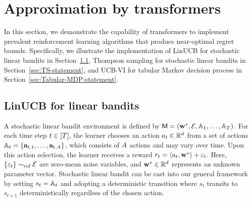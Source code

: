 \section{Approximation by transformers}\label{sec:ICRL}

In this section, we demonstrate the capability of transformers to implement prevalent reinforcement learning algorithms that produce near-optimal regret bounds. Specifically, we illustrate the implementation of LinUCB for stochastic linear bandits in Section~\ref{sec:LinUCB-statement}, Thompson sampling for stochastic linear bandits in Section~\ref{sec:TS-statement}, and UCB-VI for tabular Markov decision process in Section~\ref{sec:Tabular-MDP-statement}. %

\subsection{LinUCB for linear bandits}\label{sec:LinUCB-statement}

A stochastic linear bandit environment is defined by ${\mathsf{M}}=({{\mathbf w}^*},{\mathcal{E}},{{\mathbb{A}}}_1,\ldots,{{\mathbb{A}}}_{T})$. For each time step $t\in[{T}]$, the learner chooses an action ${a}_t\in\mathbb{R}^{d}$ from a set of actions ${\mathbb{A}}_t=\{{\mathbf a}_{t,1},\ldots,{\mathbf a}_{t,{A}}\}$, which consists of ${A}$ actions and may vary over time. Upon this action selection, the learner receives a reward ${r}_t=\left\langle{a}_t,{{\mathbf w}^*}\right\rangle+{\varepsilon}_t$. Here,$\{ {\varepsilon}_t \} \sim_{ iid} {\mathcal{E}}$ are zero-mean noise variables, and ${{\mathbf w}^*}\in\mathbb{R}^{d}$ represents an unknown parameter vector. Stochastic linear bandit can be cast into our general framework by setting $s_t = {{\mathbb{A}}}_t$ and adopting a deterministic transition where $s_t$ transits to $s_{t+1}$ deterministically regardless of the chosen action. 




